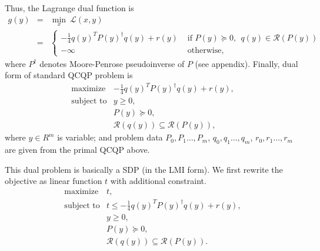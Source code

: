 \documentclass[12pt]{book}
\theoremstyle{definition}
\begin{document}
Thus, the Lagrange dual function is 
\begin{eqnarray}
g(y) &=& \min_x \ \mathcal{L}(x,y) \\
&=& \left\lbrace \begin{array}{ll} 
-\frac{1}{4}q(y)^TP(y)^{\dagger}q(y) + r(y) & \mbox{ if } P(y)\succeq 0,\ \ q(y)\in\mathcal{R}(P(y))\\ 
-\infty & \mbox{ otherwise,}
\end{array}\right. 
\end{eqnarray}
where $P^\dagger$ denotes Moore-Penrose pseudoinverse of $P$ (see appendix).
Finally, dual form of standard QCQP problem is 
\begin{equation}
\label{QCQD} 
\begin{array}{ll}
\mbox{maximize} & -\frac{1}{4}q(y)^TP(y)^{\dagger}q(y) + r(y), \\
\mbox{subject to}&  y \geq 0,\\
& P(y )\succeq 0, \\
& \mathcal{R}(q(y)) \subseteq \mathcal{R}(P(y)),
\end{array} 
\tag{QCQP Dual}
\end{equation}
where $y\in R^m$ is variable; and problem data $P_0,P_1\dots ,P_m$, $q_0,q_1\dots ,q_m$, $r_0,r_1\dots , r_m$ are given from the primal QCQP above.


This dual problem is basically a SDP (in the LMI form). We first rewrite the objective as linear function $t$ with additional constraint.
\begin{equation}
\begin{array}{ll}
\mbox{maximize} & t ,\\
\mbox{subject to}&  t\leq -\frac{1}{4}q(y)^TP(y)^{\dagger}q(y) + r(y), \\
&y \geq 0,\\
& P(y )\succeq 0,\\
& \mathcal{R}(q(y)) \subseteq \mathcal{R}(P(y)).
\end{array} 
\end{equation}
\end{document}
